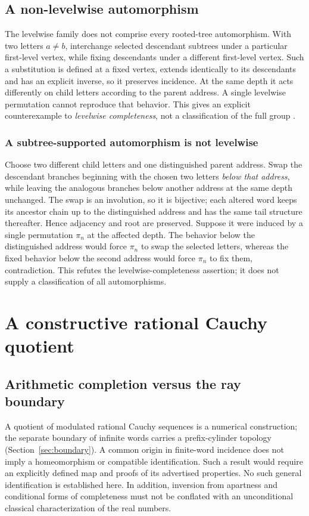 \documentclass[11pt,reqno]{amsart}
\theoremstyle{definition}\newtheorem{definition}[theorem]{Definition}
\theoremstyle{remark}\newtheorem{remark}[theorem]{Remark}
\begin{document}
\subsection{A non-levelwise automorphism}\label{main:sub-39}
The levelwise family does not comprise every rooted-tree automorphism. With two letters $a\ne b$, interchange selected descendant subtrees under a particular first-level vertex, while fixing descendants under a different first-level vertex. Such a substitution is defined at a fixed vertex, extends identically to its descendants and has an explicit inverse, so it preserves incidence. At the same depth it acts differently on child letters according to the parent address. A single levelwise permutation cannot reproduce that behavior. This gives an explicit counterexample to \emph{levelwise completeness}, not a classification of the full group \cite{bassetal}.


\medskip
\subsubsection*{A subtree-supported automorphism is not levelwise}\label{supp:11-4}
Choose two different child letters and one distinguished parent address. Swap the descendant branches beginning with the chosen two letters \emph{below that address}, while leaving the analogous branches below another address at the same depth unchanged. The swap is an involution, so it is bijective; each altered word keeps its ancestor chain up to the distinguished address and has the same tail structure thereafter. Hence adjacency and root are preserved. Suppose it were induced by a single permutation $\pi_n$ at the affected depth. The behavior below the distinguished address would force $\pi_n$ to swap the selected letters, whereas the fixed behavior below the second address would force $\pi_n$ to fix them, contradiction. This refutes the levelwise-completeness assertion; it does not supply a classification of all automorphisms.
\medskip

\clearpage
\section{A constructive rational Cauchy quotient}\label{sec:cauchy}
\subsection*{Arithmetic completion versus the ray boundary}
A quotient of modulated rational Cauchy sequences is a numerical construction; the separate boundary of infinite words carries a prefix-cylinder topology (Section~\ref{sec:boundary}). A common origin in finite-word incidence does not imply a homeomorphism or compatible identification. Such a result would require an explicitly defined map and proofs of its advertised properties. No such general identification is established here. In addition, inversion from apartness and conditional forms of completeness must not be conflated with an unconditional classical characterization of the real numbers.
\end{document}
